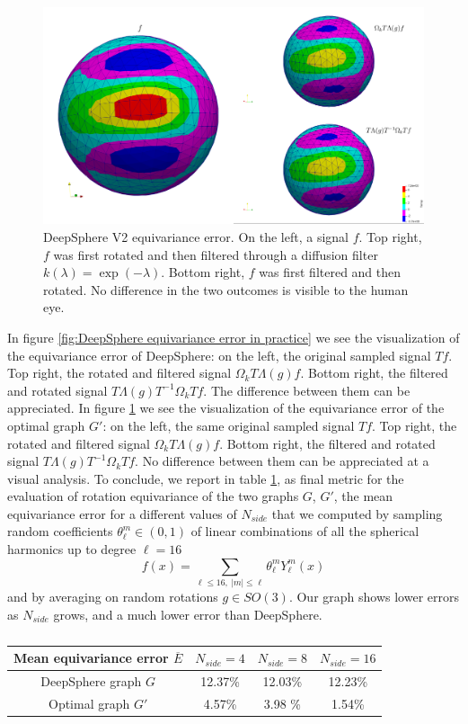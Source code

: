 \begin{figure}[h!]
	\centering
	\includegraphics[width=\textwidth]{../codes/06.Equivariance_error/img_example_thresholdedHKGL/thresholdedHKGL.png}	
	\caption{\label{fig:Optimal equivariance error in practice}DeepSphere V2 equivariance error. On the left, a signal $f$. Top right, $f$ was first rotated and then filtered through a diffusion filter $k(\lambda) = \exp (-\lambda)$. Bottom right, $f$ was first filtered and then rotated. No difference in the two outcomes is visible to the human eye.}
\end{figure}

In figure \ref{fig:DeepSphere equivariance error in practice} we see the visualization of the equivariance error of DeepSphere: on the left, the original sampled signal $Tf$. Top right, the rotated and filtered signal $\Omega_k T \Lambda(g) f$. Bottom right, the filtered and rotated signal $T \Lambda(g) T^{-1} \Omega_k T f $. The difference between them can be appreciated. In figure \ref{fig:Optimal equivariance error in practice} we see the visualization of the equivariance error of the optimal graph $G'$: on the left, the same original sampled signal $Tf$. Top right, the rotated and filtered signal $\Omega_k T \Lambda(g) f$. Bottom right, the filtered and rotated signal $T \Lambda(g) T^{-1} \Omega_k T f $. No difference between them can be appreciated at a visual analysis.
To conclude, we report in table \ref{tab:final results}, as final metric for the evaluation of rotation equivariance of the two graphs $G$, $G'$, the mean equivariance error for a different values of $N_{side}$ that we computed by sampling random coefficients $\theta_\ell^m \in(0,1)$ of linear combinations of all the spherical harmonics up to degree $\ell=16$
$$f(x) = \sum_{\ell\leq 16,\ |m|\leq\ell}\theta_\ell^m Y_\ell^m(x)
$$
and by averaging on random rotations $g\in SO(3)$. Our graph shows lower errors as $N_{side}$ grows, and a much lower error than DeepSphere.

\begin{table}
		\centering
\begin{tabular}{c|ccc}
	Mean equivariance error $\overline{E}$& $N_{side}=4$& $N_{side}=8$&$N_{side}=16$ \\\hline
	DeepSphere graph $G$ & 12.37\% & 12.03\% & 12.23\% \\
	Optimal graph $G'$ & 4.57\% & 3.98 \% & 1.54\%
\end{tabular}
\caption{\label{tab:final results}}
\end{table}

